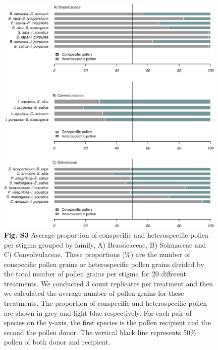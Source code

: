 \documentclass[12pt,]{article}
\begin{document}
\clearpage

\begin{figure}
\centering
\includegraphics{Supp_Material_files/figure-latex/unnamed-chunk-12-1.pdf}
\caption{\textbf{Fig. S3} Average proportion of conspecific and
heterospecific pollen per stigma grouped by family, A) Brassicaceae, B)
Solanaceae and C) Convolvulaceae. These proportions (\%) are the number
of conspecific pollen grains or heterospecific pollen grains divided by
the total number of pollen grains per stigma for 20 different
treatments. We conducted 3 count replicates per treatment and then we
calculated the average number of pollen grains for these treatments. The
proportion of conspecific and heterospecific pollen are shown in grey
and light blue respectively. For each pair of species on the y-axis, the
first species is the pollen recipient and the second the pollen donor.
The vertical black line represents 50\% pollen of both donor and
recipient.}
\end{figure}

\clearpage
\end{document}
